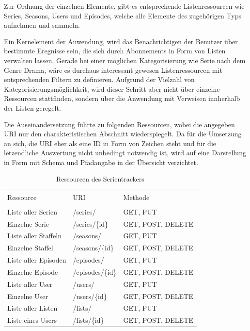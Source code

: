 \documentclass[a4paper]{article}
\begin{document}
Zur Ordnung der einzelnen Elemente, gibt es entsprechende Listenressourcen wie Series, Seasons, Users und Episodes, welche alle Elemente des zugehörigen Typs aufnehmen und sammeln.

Ein Kernelement der Anwendung, wird das Benachrichtigen der Benutzer über bestimmte Eregnisse sein, die sich durch Abonnements in Form von Listen verwalten lassen. Gerade bei einer möglichen Kategorisierung wie Serie nach dem Genre Drama, wäre es durchaus interessant gewesen Listenressourcen mit entsprechenden Filtern zu definieren. Aufgrund der Vielzahl von Kategorisierungsmöglichkeit, wird dieser Schritt aber nicht über einzelne Ressourcen stattfinden, sondern über die Anwendung mit Verweisen innherhalb der Listen geregelt.

\newpage

Die Auseinandersetzung führte zu folgenden Ressourcen, wobei die angegeben URI nur den charakteristischen Abschnitt wiederspiegelt.
Da für die Umsetzung an sich, die URI eher als eine ID in Form von Zeichen steht und für die letzendliche Auswertung nicht unbedingt notwendig ist, wird auf eine Darstellung in Form mit Schema und Pfadangabe in der Übersicht verzichtet.


\begin{table}[H]
\caption{Ressourcen des Serientrackers}

\centering
\begin{tabular}{l l l}
\\ [-0.5ex]

\hline\hline
\\ [-0.5ex]
Ressource & URI & Methode
\\ [1.5ex]
\hline
\\ [-0.5ex]
Liste aller Serien & /series/ & GET, PUT \\[1ex]
Einzelne Serie & /series/\{id\} & GET, POST, DELETE\\[1ex]
Liste aller Staffeln & /seasons/ & GET, PUT \\[1ex]
Einzelne Staffel & /seasons/\{id\} & GET, POST, DELETE\\[1ex]
Liste aller Episoden & /episodes/ & GET, PUT \\[1ex]
Einzelne Episode & /episodes/\{id\} & GET, POST, DELETE\\[1ex]
Liste aller User & /users/ & GET, PUT \\[1ex]
Einzelne User & /users/\{id\} & GET, POST, DELETE\\[1ex]
Liste aller Listen & /lists/ & GET, PUT\\[1ex]
Liste eines Users & /lists/\{id\} & GET, POST, DELETE\\[1ex]
\hline
\end{tabular}
\label{tab:ressourcendesserientrackers}
\end{table}
\end{document}
